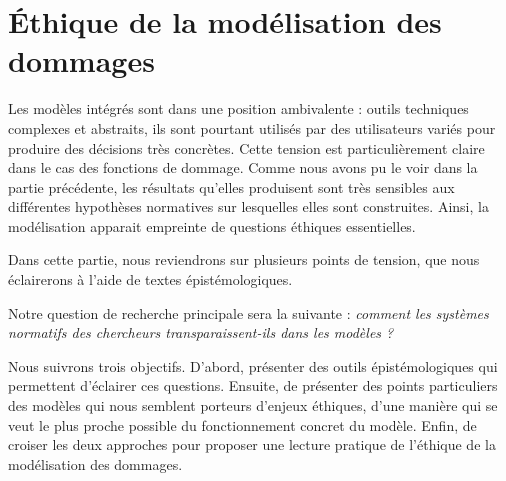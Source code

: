 \chapter{Éthique de la modélisation des dommages}
\label{chapter:ethique}
\newrefsegment





Les modèles intégrés sont dans une position ambivalente : outils techniques complexes et abstraits, ils sont pourtant utilisés par des utilisateurs variés pour produire des décisions très concrètes. Cette tension est particulièrement claire dans le cas des fonctions de dommage. Comme nous avons pu le voir dans la partie précédente, les résultats qu'elles produisent sont très sensibles aux différentes hypothèses normatives sur lesquelles elles sont construites. Ainsi, la modélisation apparait empreinte de questions éthiques essentielles. 

Dans cette partie, nous reviendrons sur plusieurs points de tension, que nous éclairerons à l'aide de textes épistémologiques. 

Notre question de recherche principale sera la suivante : \textit{comment les systèmes normatifs des chercheurs transparaissent-ils dans les modèles ?}

Nous suivrons trois objectifs. D'abord, présenter des outils épistémologiques qui permettent d'éclairer ces questions. Ensuite, de présenter des points particuliers des modèles qui nous semblent porteurs d'enjeux éthiques, d'une manière qui se veut le plus proche possible du fonctionnement concret du modèle. Enfin, de croiser les deux approches pour proposer une lecture pratique de l'éthique de la modélisation des dommages. 

